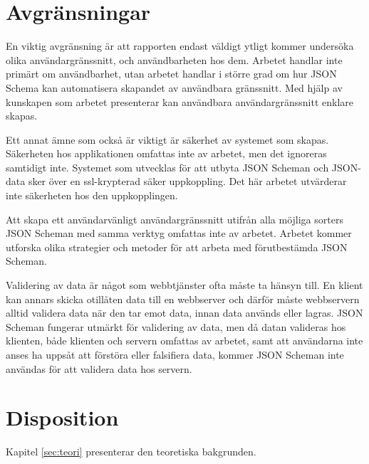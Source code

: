 \section{Avgränsningar}
\label{sec:intro:avgränsningar}
En viktig avgränsning är att rapporten endast väldigt ytligt kommer undersöka olika användargränssnitt, och användbarheten hos dem. Arbetet handlar inte primärt om användbarhet, utan arbetet handlar i större grad om hur JSON Schema kan automatisera skapandet av användbara gränssnitt. Med hjälp av kunskapen som arbetet presenterar kan användbara användargränssnitt enklare skapas.

Ett annat ämne som också är viktigt är säkerhet av systemet som skapas. Säkerheten hos applikationen omfattas inte av arbetet, men det ignoreras samtidigt inte. Systemet som utvecklas för att utbyta JSON Scheman och JSON-data sker över en ssl-krypterad säker uppkoppling. Det här arbetet utvärderar inte säkerheten hos den uppkopplingen.

Att skapa ett användarvänligt användargränssnitt utifrån alla möjliga sorters JSON Scheman med samma verktyg omfattas inte av arbetet. Arbetet kommer utforska olika strategier och metoder för att arbeta med förutbestämda JSON Scheman.

Validering av data är något som webbtjänster ofta måste ta hänsyn till. En klient kan annars skicka otillåten data till en webbserver och därför måste webbservern alltid validera data när den tar emot data, innan data används eller lagras. JSON Scheman fungerar utmärkt för validering av data, men då datan valideras hos klienten, både klienten och servern omfattas av arbetet, samt att användarna inte anses ha uppsåt att förstöra eller falsifiera data, kommer JSON Scheman inte användas för att validera data hos servern.

\section{Disposition}
\label{sec:intro:disposition}
Kapitel \ref{sec:teori} presenterar den teoretiska bakgrunden.
